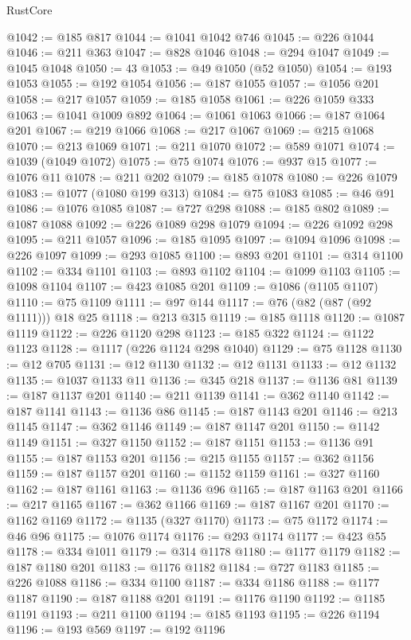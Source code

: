 \begin{lexlean}{RustCore}
\begin{coremodule}
@1042 := @185 @817
@1044 := @1041 @1042 @746
@1045 := @226 @1044
@1046 := @211 @363
@1047 := @828 @1046
@1048 := @294 @1047
@1049 := @1045 @1048
@1050 := 43
@1053 := @49 @1050 (@52 @1050)
@1054 := @193 @1053
@1055 := @192 @1054
@1056 := @187 @1055
@1057 := @1056 @201
@1058 := @217 @1057
@1059 := @185 @1058
@1061 := @226 @1059 @333
@1063 := @1041 @1009 @892
@1064 := @1061 @1063
@1066 := @187 @1064 @201
@1067 := @219 @1066
@1068 := @217 @1067
@1069 := @215 @1068
@1070 := @213 @1069
@1071 := @211 @1070
@1072 := @589 @1071
@1074 := @1039 (@1049 @1072)
@1075 := @75 @1074
@1076 := @937 @15
@1077 := @1076 @11
@1078 := @211 @202
@1079 := @185 @1078
@1080 := @226 @1079
@1083 := @1077 (@1080 @199 @313)
@1084 := @75 @1083
@1085 := @46 @91
@1086 := @1076 @1085
@1087 := @727 @298
@1088 := @185 @802
@1089 := @1087 @1088
@1092 := @226 @1089 @298 @1079
@1094 := @226 @1092 @298
@1095 := @211 @1057
@1096 := @185 @1095
@1097 := @1094 @1096
@1098 := @226 @1097
@1099 := @293 @1085
@1100 := @893 @201
@1101 := @314 @1100
@1102 := @334 @1101
@1103 := @893 @1102
@1104 := @1099 @1103
@1105 := @1098 @1104
@1107 := @423 @1085 @201
@1109 := @1086 (@1105 @1107)
@1110 := @75 @1109
@1111 := @97 @144
@1117 := @76 (@82 (@87 (@92 @1111))) @18 @25
@1118 := @213 @315
@1119 := @185 @1118
@1120 := @1087 @1119
@1122 := @226 @1120 @298
@1123 := @185 @322
@1124 := @1122 @1123
@1128 := @1117 (@226 @1124 @298 @1040)
@1129 := @75 @1128
@1130 := @12 @705
@1131 := @12 @1130
@1132 := @12 @1131
@1133 := @12 @1132
@1135 := @1037 @1133 @11
@1136 := @345 @218
@1137 := @1136 @81
@1139 := @187 @1137 @201
@1140 := @211 @1139
@1141 := @362 @1140
@1142 := @187 @1141
@1143 := @1136 @86
@1145 := @187 @1143 @201
@1146 := @213 @1145
@1147 := @362 @1146
@1149 := @187 @1147 @201
@1150 := @1142 @1149
@1151 := @327 @1150
@1152 := @187 @1151
@1153 := @1136 @91
@1155 := @187 @1153 @201
@1156 := @215 @1155
@1157 := @362 @1156
@1159 := @187 @1157 @201
@1160 := @1152 @1159
@1161 := @327 @1160
@1162 := @187 @1161
@1163 := @1136 @96
@1165 := @187 @1163 @201
@1166 := @217 @1165
@1167 := @362 @1166
@1169 := @187 @1167 @201
@1170 := @1162 @1169
@1172 := @1135 (@327 @1170)
@1173 := @75 @1172
@1174 := @46 @96
@1175 := @1076 @1174
@1176 := @293 @1174
@1177 := @423 @55
@1178 := @334 @1011
@1179 := @314 @1178
@1180 := @1177 @1179
@1182 := @187 @1180 @201
@1183 := @1176 @1182
@1184 := @727 @1183
@1185 := @226 @1088
@1186 := @334 @1100
@1187 := @334 @1186
@1188 := @1177 @1187
@1190 := @187 @1188 @201
@1191 := @1176 @1190
@1192 := @1185 @1191
@1193 := @211 @1100
@1194 := @185 @1193
@1195 := @226 @1194
@1196 := @193 @569
@1197 := @192 @1196

\end{coremodule}
\end{lexlean}
